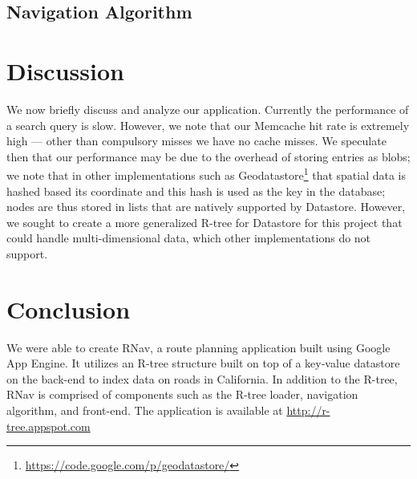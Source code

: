 \documentclass{scrartcl}
\newcommand{\TODO}[1]{\textcolor{red}{\boxed{\mathbf{TODO }} {\textit{#1}} }}
\begin{document}

\subsection{Navigation Algorithm}


\section{Discussion}
\label{sec:analysis}
We now briefly discuss and analyze our application. Currently the performance of a search query is slow. However, we note that our Memcache hit rate is extremely high --- other than compulsory misses we have no cache misses. We speculate then that our performance may be due to the overhead of storing entries as blobs; we note that in other implementations such as Geodatastore\footnote{\url{https://code.google.com/p/geodatastore/}} that spatial data is hashed based its coordinate and this hash is used as the key in the database; nodes are thus stored in lists that are natively supported by Datastore. However, we sought to create a more generalized R-tree for Datastore for this project that could handle multi-dimensional data, which other implementations do not support.

\section{Conclusion}
\label{sec:conclusion}
We were able to create RNav, a route planning application built using Google App Engine. It utilizes an R-tree structure built on top of a key-value datastore on the back-end to index data on roads in California. In addition to the R-tree, RNav is comprised of components such as the R-tree loader, navigation algorithm, and front-end. The application is available at \url{http://r-tree.appspot.com}



\end{document}
